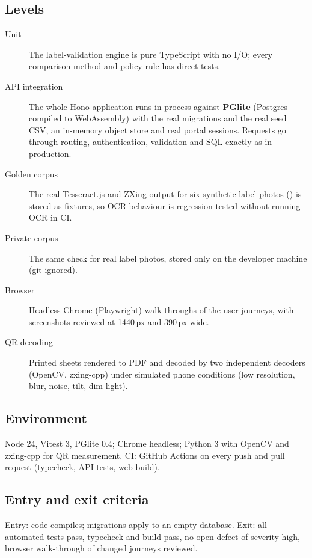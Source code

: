 \documentclass[11pt,a4paper]{article}
\begin{document}
\subsection{Levels}
\begin{description}
  \item[Unit] The label-validation engine is pure TypeScript with no I/O; every comparison method and policy rule has
    direct tests.
  \item[API integration] The whole Hono application runs in-process against \textbf{PGlite} (Postgres compiled to
    WebAssembly) with the real migrations and the real seed CSV, an in-memory object store and real portal sessions.
    Requests go through routing, authentication, validation and SQL exactly as in production.
  \item[Golden corpus] The real Tesseract.js and ZXing output for six synthetic label photos () is
    stored as fixtures, so OCR behaviour is regression-tested without running OCR in CI.
  \item[Private corpus] The same check for real label photos, stored only on the developer machine (git-ignored).
  \item[Browser] Headless Chrome (Playwright) walk-throughs of the user journeys, with screenshots reviewed at
    1440\,px and 390\,px wide.
  \item[QR decoding] Printed sheets rendered to PDF and decoded by two independent decoders (OpenCV, zxing-cpp)
    under simulated phone conditions (low resolution, blur, noise, tilt, dim light).
\end{description}

\subsection{Environment}
Node 24, Vitest 3, PGlite 0.4; Chrome headless; Python 3 with OpenCV and zxing-cpp for QR measurement. CI: GitHub
Actions  on every push and pull request (typecheck, API tests, web build).

\subsection{Entry and exit criteria}
Entry: code compiles; migrations apply to an empty database. Exit: all automated tests pass, typecheck and build pass,
no open defect of severity high, browser walk-through of changed journeys reviewed.

\end{document}
